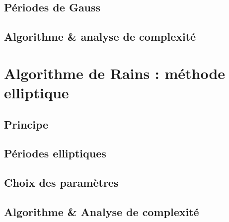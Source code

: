 \documentclass[a4paper]{article} %
\numberwithin{section}{part}
\numberwithin{equation}{section}
\begin{document}
\subsection{Périodes de Gauss}
\label{pergauss}

\subsection{Algorithme \& analyse de complexité}

\section{Algorithme de Rains : méthode elliptique}
\subsection{Principe}

\subsection{Périodes elliptiques}


\subsection{Choix des paramètres}

\subsection{Algorithme \& Analyse de complexité}
\end{document}

